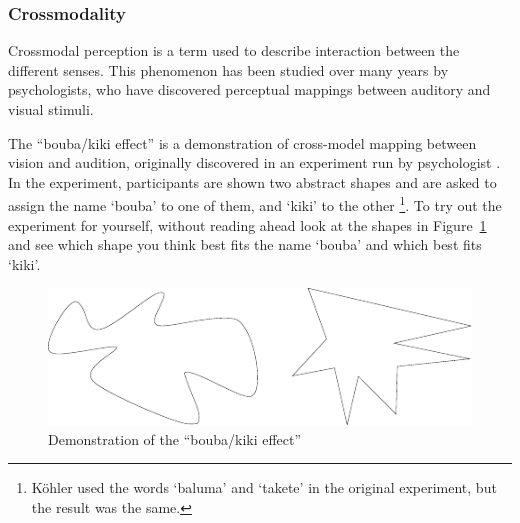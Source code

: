 


\subsubsection{Crossmodality}
Crossmodal perception is a term used to describe interaction between the different senses. This phenomenon has been
studied over many years by psychologists, who have discovered perceptual mappings between auditory and visual stimuli.

The ``bouba/kiki effect'' is a demonstration of cross-model mapping between vision and audition, originally discovered
in an experiment run by psychologist \citet{Koehler1929}. In the experiment, participants are shown two abstract shapes
and are asked to assign the name `bouba' to one of them, and `kiki' to the other \footnote{K\"ohler used the words
  `baluma' and `takete' in the original experiment, but the result was the same.}. To try out the experiment for
yourself, without reading ahead look at the shapes in Figure~\ref{fig:boubakiki} and see which shape you think best
fits the name `bouba' and which best fits `kiki'.

\begin{figure}[ht]
\centering
  \centering
  \includegraphics[width=\linewidth]{figs/bouba-kiki.pdf}
  \caption{Demonstration of the ``bouba/kiki effect'' \citep{Ramachandran2001}}
  \label{fig:boubakiki}
\end{figure}

